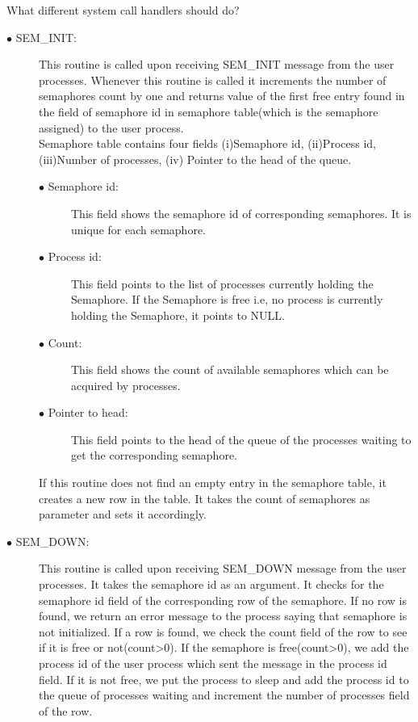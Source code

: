 \documentclass[a4paper,11pt,twocolumn]{article}
\begin{document}
What different system call handlers should do?\\

\begin{description}
  \item[$\bullet$ SEM\_INIT:] This routine is called upon receiving SEM\_INIT message from the user processes. Whenever this routine is called it increments the number of semaphores count by one and returns value of the first free entry found in the field of semaphore id in semaphore table(which is the semaphore assigned) to the user process.\\
Semaphore table contains four fields (i)Semaphore id, (ii)Process id, (iii)Number of processes, (iv) Pointer to the head of the queue.\\
\begin{description}
  \item[$\bullet$ Semaphore id:] This field shows the semaphore id of corresponding semaphores. It is unique for each semaphore.
  \item[$\bullet$ Process id:] This field points to the list of processes currently holding the Semaphore. If the Semaphore is free i.e, no process is currently holding the Semaphore, it points to NULL.
  \item[$\bullet$ Count:] This field shows the count of available semaphores which can be acquired by processes.
  \item[$\bullet$ Pointer to head:] This field points to the head of the queue of the processes waiting to get the corresponding semaphore.
\end{description}
If this routine does not find an empty entry in the semaphore table, it creates a new row in the table. It takes the count of semaphores as parameter and sets it accordingly.
\item[$\bullet$ SEM\_DOWN:] This routine is called upon receiving SEM\_DOWN message from the user processes. It takes the semaphore id as an argument. It checks for the semaphore id field of the corresponding row of the semaphore. If no row is found, we return an error message to the process saying that semaphore is not initialized. If a row is found, we check the count field of the row to see if it is free or not(count\textgreater0). If the semaphore is free(count\textgreater0), we add the process id of the user process which sent the message in the process id field. If it is not free, we put the process to sleep and add the process id to the queue of processes waiting and increment the number of processes field of the row.

\end{description}
\end{document}
